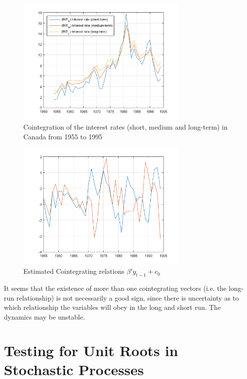 \documentclass[11pt,a4,twosided,singlespacing,titlepagenumber=on]{scrreprt}
\numberwithin{equation}{chapter} %
\theoremstyle{remark}
\begin{document}
\begin{figure}[H]
\centering
\includegraphics[width = 0.75\textwidth]{TestMultipleSeriesForCointegrationUsingJcitestExample_01}
\caption{Cointegration of the interest rates (short, medium and long-term) in Canada from 1955 to 1995}
\label{TestMultipleSeriesForCointegrationUsingJcitestExample_01}
\end{figure}

\begin{figure}[H]
\centering
\includegraphics[width = 0.75\textwidth]{TestMultipleSeriesForCointegrationUsingJcitestExample_02}
\caption{Estimated Cointegrating relations $\beta' y_{t-1} + c_0$}
\label{TestMultipleSeriesForCointegrationUsingJcitestExample_02}
\end{figure}

It seems that the existence of more than one cointegrating vectors (i.e. the long-run relationship) is not necessarily a good sign, since there is uncertainty as to which relationship the variables will obey in the long and short run. The dynamics may be unstable.

\section{Testing for Unit Roots in Stochastic Processes}
\end{document}
